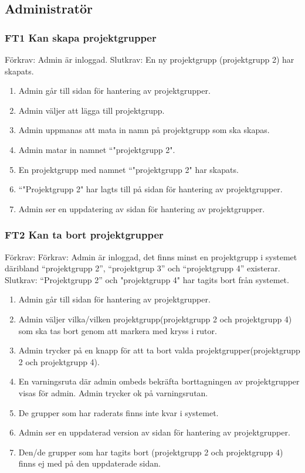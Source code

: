 \documentclass[paper=a4, fontsize=11pt,twoside]{article}
\begin{document}
\subsection{Administratör}

\subsubsection*{FT1 Kan skapa projektgrupper}
Förkrav: Admin är inloggad.
\newline
Slutkrav:  En ny projektgrupp (projektgrupp 2) har skapats.

\begin{enumerate}
	\item Admin går till sidan för hantering av projektgrupper.
	\item Admin väljer att lägga till projektgrupp.
	\item Admin uppmanas att mata in namn på projektgrupp som ska skapas.
	\item Admin matar in namnet ``"projektgrupp 2".
	\item En projektgrupp med namnet ``"projektgrupp 2" har skapats.
	\item ``"Projektgrupp 2" har lagts till på sidan för hantering av
	projektgrupper.
	\item Admin ser en uppdatering av sidan för hantering av projektgrupper.
\end{enumerate}

\subsubsection*{FT2 Kan ta bort projektgrupper}
Förkrav: Förkrav: Admin är inloggad, det finns minst en projektgrupp i systemet
däribland “projektgrupp 2”, “projektgrup 3” och “projektgrupp 4” existerar.
\newline
Slutkrav: “Projektgrupp 2” och "projektgrupp 4" har tagits bort från
systemet.
\begin{enumerate}
	\item Admin går till sidan för hantering av projektgrupper.
	\item Admin väljer vilka/vilken projektgrupp(projektgrupp 2 och projektgrupp 4)
	som ska tas bort genom att markera med kryss i rutor.
	\item Admin trycker på en knapp för att ta bort valda
	projektgrupper(projektgrupp 2 och projektgrupp 4).
	\item En varningsruta där admin ombeds bekräfta borttagningen av projektgrupper
	visas för admin. Admin trycker ok på varningsrutan.
	\item De grupper som har raderats finns inte kvar i systemet.
	\item Admin ser en uppdaterad version av sidan för hantering av projektgrupper.
	\item Den/de grupper som har tagits bort (projektgrupp 2 och projektgrupp 4)
	finns ej med på den uppdaterade sidan.
\end{enumerate}
\end{document}
